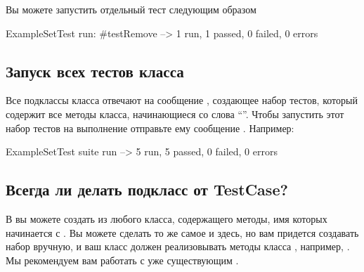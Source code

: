 \documentclass[a4paper,10pt,twoside]{book}
\begin{document}
Вы можете запустить отдельный тест следующим образом

\begin{code}{}
ExampleSetTest run: #testRemove --> 1 run, 1 passed, 0 failed, 0 errors
\end{code}

\subsection{Запуск всех тестов класса}

Все подклассы класса  отвечают на сообщение ,
создающее набор тестов,
который содержит все методы класса, начинающиеся со слова ``''.
Чтобы запустить этот набор тестов на выполнение отправьте ему сообщение . Например:

\begin{code}{}
ExampleSetTest suite run --> 5 run, 5 passed, 0 failed, 0 errors
\end{code}

\subsection{Всегда ли делать подкласс от TestCase?}

В \JUnit{} вы можете создать  из любого класса,
содержащего методы, имя которых начинается с .
Вы можете сделать то же самое и здесь, но вам придется создавать набор вручную,
и ваш класс должен реализовывать методы класса , например, .
Мы рекомендуем вам работать с уже существующим \SUnit.
\end{document}
